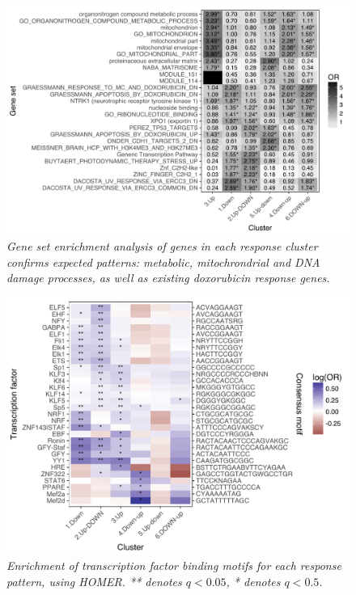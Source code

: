 \documentclass{article}
\begin{document}
{\begin{figure}[h]
\begin{center}
    \includegraphics[width=1\textwidth]{../figures/cluster_go.pdf} %
    \caption{\it{Gene set enrichment analysis of genes in each response cluster confirms expected patterns: metabolic, mitochrondrial and DNA damage processes, as well as existing doxorubicin response genes.}}
    \label{fig:go}
    \end{center}
\end{figure}

\begin{figure}[h]
\begin{center}
    \includegraphics[width=1\textwidth]{../figures/cluster_tf.pdf} %
    \caption{\it{Enrichment of transcription factor binding motifs for each response pattern, using HOMER. ** denotes $q<0.05$, * denotes $q<0.5$.}}
    \label{fig:tf}
    \end{center}
\end{figure}

}
\end{document}

